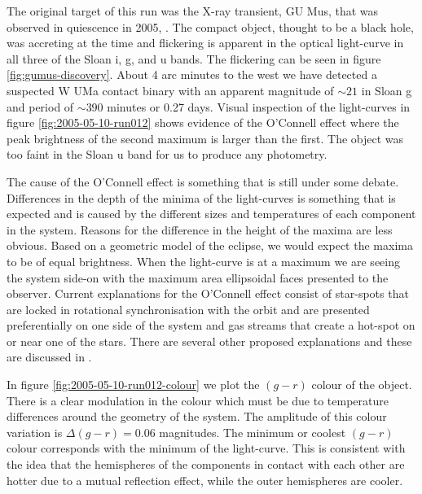   
The original target of this run was the X-ray transient, {GU Mus}, that was observed in quiescence in 2005, \citep{tariq2010}. The compact object, thought to be a black hole, was accreting at the time and flickering is apparent in the optical light-curve in all three of the Sloan i, g, and u bands. The flickering can be seen in figure \ref{fig:gumus-discovery}. About 4 arc minutes to the west we have detected a suspected {W UMa} contact binary with an apparent magnitude of $\sim21$ in Sloan g and period of $\sim 390$ minutes or 0.27 days. Visual inspection of the light-curves in figure \ref{fig:2005-05-10-run012} shows evidence of the O'Connell effect where the peak brightness of the second maximum is larger than the first. The object was too faint in the Sloan u band for us to produce any photometry. 

The cause of the O'Connell effect is something that is still under some debate. Differences in the depth of the minima of the light-curves is something that is expected and is caused by the different sizes and temperatures of each component in the system. Reasons for the difference in the height of the maxima are less obvious. Based on a geometric model of the eclipse, we would expect the maxima to be of equal brightness. When the light-curve is at a maximum we are seeing the system side-on with the maximum area ellipsoidal faces presented to the observer. Current explanations for the O'Connell effect consist of star-spots that are locked in rotational synchronisation with the orbit and are presented preferentially on one side of the system and gas streams that create a hot-spot on or near one of the stars. There are several other proposed explanations and these are discussed in \citet{oconnelleffect}.  

In figure \ref{fig:2005-05-10-run012-colour} we plot the $(g-r)$ colour of the object. There is a clear modulation in the colour which must be due to temperature differences around the geometry of the system. The amplitude of this colour variation is $\Delta(g-r) = 0.06$ magnitudes. The minimum or coolest $(g - r)$ colour corresponds with the minimum of the light-curve. This is consistent with the idea that the hemispheres of the components in contact with each other are hotter due to a mutual reflection effect, while the outer hemispheres are cooler. 

